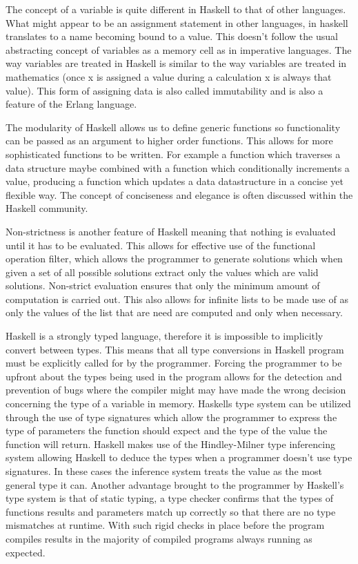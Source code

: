 \documentclass[main.tex]{subfiles}
\begin{document}
{{The concept of a variable is quite different in Haskell to that of other languages. What might appear to be an assignment statement in other languages, in haskell translates to a name becoming bound to a value. This doesn't follow the usual abstracting concept of variables as a memory cell as in imperative languages. The way variables are treated in Haskell is similar to the way variables are treated in mathematics (once x is assigned a value during a calculation x is always that value). This form of assigning data is also called immutability and is also a feature of the Erlang language.

The modularity of Haskell allows us to define generic functions so functionality can be passed as an argument to higher order functions. This allows for more sophisticated functions to be written. For example a function which traverses a data structure maybe combined with a function which conditionally increments a value, producing a function which updates a data datastructure in a concise yet flexible way. The concept of conciseness and elegance is often discussed within the Haskell community.

Non-strictness is another feature of Haskell meaning that nothing is evaluated until it has to be evaluated. This allows for effective use of the functional operation filter, which allows the programmer to generate solutions which when given a set of all possible solutions extract only the values which are valid solutions. Non-strict evaluation ensures that only the minimum amount of computation is carried out. This also allows for infinite lists to be made use of as only the values of the list that are need are computed and only when necessary.

Haskell is a strongly typed language, therefore it is impossible to implicitly convert between types. This means that all type conversions in Haskell program must be explicitly called for by the programmer. Forcing the programmer to be upfront about the types being used in the program allows for the detection and prevention of bugs where the compiler might may have made the wrong decision concerning the type of a variable in memory. Haskells type system can be utilized through the use of type signatures which allow the programmer to express the type of parameters the function should expect and the type of the value the function will return. Haskell makes use of the Hindley-Milner type inferencing system allowing Haskell to deduce the types when a programmer doesn't use type signatures.\cite{Marlow2010} In these cases the inference system treats the value as the most general type it can. Another advantage brought to the programmer by Haskell's type system is that of static typing, a type checker confirms that the types of functions results and parameters match up correctly so that there are no type mismatches at runtime. With such rigid checks in place before the program compiles results in the majority of compiled programs always running as expected.

}}
\end{document}
